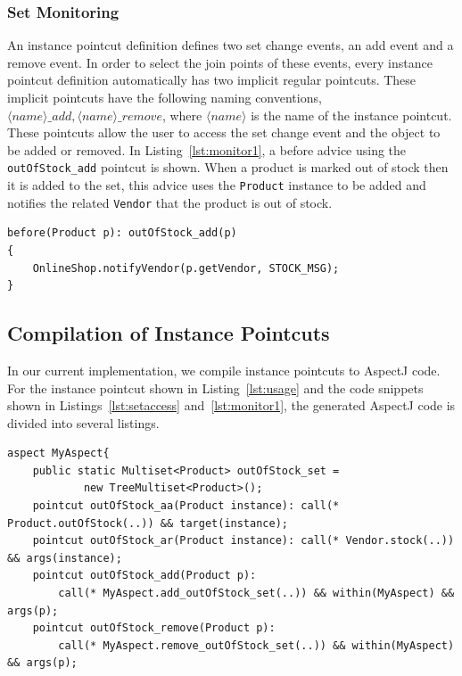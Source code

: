 \documentclass{acm_proc_article-sp}
\begin{document}
\subsubsection{Set Monitoring}
An instance pointcut definition defines two set change events, an add event and a remove event. In order to select the join points of these events, every instance pointcut definition automatically has two implicit regular pointcuts. These implicit pointcuts have the following naming conventions, $\langle name \rangle\_add, \langle name \rangle\_remove$, where $\langle name \rangle$ is the name of the instance pointcut. These pointcuts allow the user to access the set change event and the object to be added or removed. In Listing~\ref{lst:monitor1}, a before advice using the \texttt{outOfStock_add} pointcut is shown. When a product is marked out of stock then it is added to the set, this advice uses the \texttt{Product} instance to be added and notifies the related \texttt{Vendor} that the product is out of stock.

\begin{lstlisting}[float=h!, caption={Set monitoring pointcut used to notify vendors}, label={lst:monitor1}]
before(Product p): outOfStock_add(p)
{
	OnlineShop.notifyVendor(p.getVendor, STOCK_MSG);
}
\end{lstlisting}






\subsection{Compilation of Instance Pointcuts}
In our current implementation, we compile instance pointcuts to AspectJ code. For the instance pointcut shown in Listing~\ref{lst:usage} and the code snippets shown in Listings~\ref{lst:setaccess} and~\ref{lst:monitor1}, the generated AspectJ code is divided into several listings.

\begin{lstlisting}[float=h!, caption={The generated AspectJ pointcuts from \texttt{outOfStock} instance pointcut}, label={lst:generated1}]
aspect MyAspect{
	public static Multiset<Product> outOfStock_set =
			new TreeMultiset<Product>();
	pointcut outOfStock_aa(Product instance): call(* Product.outOfStock(..)) && target(instance);
	pointcut outOfStock_ar(Product instance): call(* Vendor.stock(..)) && args(instance);
	pointcut outOfStock_add(Product p): 
		call(* MyAspect.add_outOfStock_set(..)) && within(MyAspect) && args(p);
	pointcut outOfStock_remove(Product p): 
		call(* MyAspect.remove_outOfStock_set(..)) && within(MyAspect) && args(p);
\end{lstlisting}	
\end{document}
